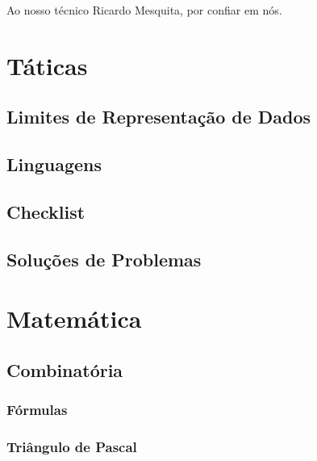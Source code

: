 





\begin{dedication}
\Large{Ao nosso técnico Ricardo Mesquita, por confiar em nós.}
\end{dedication}

\tableofcontents


\chapter{Táticas}
    \section{Limites de Representação de Dados}
        
        \newpage
    \section{Linguagens}
        
        \newpage
    \section{Checklist}
        
        \newpage
    \section{Soluções de Problemas}
        
        \newpage
\chapter{Matemática}
    \section{Combinatória}
        \subsection{Fórmulas}
            
        \subsection{Triângulo de Pascal}
            
            \newpage
